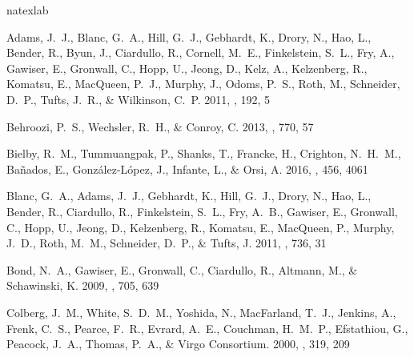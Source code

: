 \documentclass{emulateapj}
\begin{document}

%
\begin{thebibliography}{39}
\expandafter\ifx\csname natexlab\endcsname\relax\def\natexlab#1{#1}\fi

{Adams}, J.~J., {Blanc}, G.~A., {Hill}, G.~J., {Gebhardt}, K., {Drory}, N.,
  {Hao}, L., {Bender}, R., {Byun}, J., {Ciardullo}, R., {Cornell}, M.~E.,
  {Finkelstein}, S.~L., {Fry}, A., {Gawiser}, E., {Gronwall}, C., {Hopp}, U.,
  {Jeong}, D., {Kelz}, A., {Kelzenberg}, R., {Komatsu}, E., {MacQueen}, P.~J.,
  {Murphy}, J., {Odoms}, P.~S., {Roth}, M., {Schneider}, D.~P., {Tufts}, J.~R.,
  \& {Wilkinson}, C.~P. 2011, \apjs, 192, 5

{Behroozi}, P.~S., {Wechsler}, R.~H., \& {Conroy}, C. 2013, \apj, 770, 57

{Bielby}, R.~M., {Tummuangpak}, P., {Shanks}, T., {Francke}, H., {Crighton},
  N.~H.~M., {Ba{\~n}ados}, E., {Gonz{\'a}lez-L{\'o}pez}, J., {Infante}, L., \&
  {Orsi}, A. 2016, \mnras, 456, 4061

{Blanc}, G.~A., {Adams}, J.~J., {Gebhardt}, K., {Hill}, G.~J., {Drory}, N.,
  {Hao}, L., {Bender}, R., {Ciardullo}, R., {Finkelstein}, S.~L., {Fry}, A.~B.,
  {Gawiser}, E., {Gronwall}, C., {Hopp}, U., {Jeong}, D., {Kelzenberg}, R.,
  {Komatsu}, E., {MacQueen}, P., {Murphy}, J.~D., {Roth}, M.~M., {Schneider},
  D.~P., \& {Tufts}, J. 2011, \apj, 736, 31

{Bond}, N.~A., {Gawiser}, E., {Gronwall}, C., {Ciardullo}, R., {Altmann}, M.,
  \& {Schawinski}, K. 2009, \apj, 705, 639

{Colberg}, J.~M., {White}, S.~D.~M., {Yoshida}, N., {MacFarland}, T.~J.,
  {Jenkins}, A., {Frenk}, C.~S., {Pearce}, F.~R., {Evrard}, A.~E., {Couchman},
  H.~M.~P., {Efstathiou}, G., {Peacock}, J.~A., {Thomas}, P.~A., \& {Virgo
  Consortium}. 2000, \mnras, 319, 209


\end{thebibliography}
\end{document}
